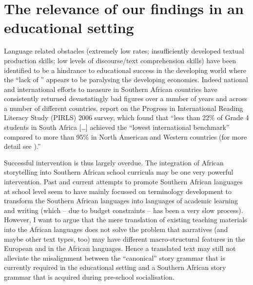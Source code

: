 \documentclass[output=paper,modfonts]{langscibook}
\begin{document}
\section{The relevance of our findings in an educational setting}\label{sec:tappe:5}


Language related obstacles (extremely low  rates; insufficiently developed textual production skills; low levels of discourse/text comprehension skills) have been identified to be a  hindrance to educational success in the developing world where the “lack of ” appears to be paralysing the developing economies. Indeed national and international efforts to measure  in Southern African countries have consistently returned devastatingly bad figures over a number of years and across a number of different countries. \citet[23]{Smith2011} report on the Progress in International Reading Literacy Study (PIRLS) 2006 survey, which found that “less than 22\% of Grade 4 students in South Africa […] achieved the “lowest international benchmark” compared to more than 95\% in North American and Western countries (for more detail see \citealt[69]{MullisEtAl2007}).” 

Successful intervention is thus largely overdue. The integration of African storytelling into Southern African school curricula may be one very powerful intervention. Past and current attempts to promote Southern African languages at school level seem to have mainly focussed on terminology development to transform the Southern African languages into languages of academic learning and writing (which – due to budget constraints – has been a very slow process). However, I want to argue that the mere translation of existing teaching materials into the African languages does not solve the problem that narratives (and maybe other text types, too) may have different macro-structural features in the European and in the African languages. Hence a translated text may still not alleviate the misalignment between the “canonical” story grammar that is currently required in the educational setting and a Southern African story grammar that is acquired during pre-school socialisation.
\end{document}
